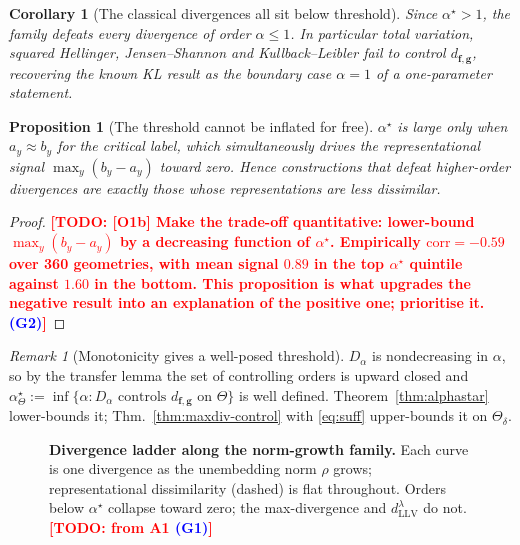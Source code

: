 \documentclass{article}
\newcommand{\TODO}[1]{\textcolor{red}{\textbf{[TODO: #1]}}}
\newcommand{\GATE}[1]{\textcolor{blue}{\textsf{\small (#1)}}}
\newcommand{\bff}{\mathbf{f}}
\newcommand{\bfg}{\mathbf{g}}
\newcommand{\dLLV}{d^{\lambda}_{\mathrm{LLV}}}
\newcommand{\dfg}{d_{\bff,\bfg}}
\newcommand{\Dalpha}{D_{\alpha}}
\newcommand{\Thetadelta}{\Theta_{\delta}}
\theoremstyle{plain}
\newtheorem{proposition}[theorem]{Proposition}
\newtheorem{corollary}[theorem]{Corollary}
\theoremstyle{definition}
\theoremstyle{remark}
\newtheorem{remark}[theorem]{Remark}
\begin{document}
\begin{corollary}[The classical divergences all sit below threshold]
\label{cor:below}
Since $\alpha^{\star}>1$, the family defeats every divergence of order
$\alpha\le1$. In particular total variation, squared Hellinger,
Jensen--Shannon and Kullback--Leibler fail to control $\dfg$, recovering the
known KL result as the boundary case $\alpha=1$ of a one-parameter statement.
\end{corollary}

\begin{proposition}[The threshold cannot be inflated for free]
\label{prop:tradeoff}
$\alpha^{\star}$ is large only when $a_{y}\approx b_{y}$ for the critical
label, which simultaneously drives the representational signal
$\max_{y}(b_{y}-a_{y})$ toward zero. Hence constructions that defeat
higher-order divergences are exactly those whose representations are less
dissimilar.
\end{proposition}
\begin{proof}
\TODO{[O1b] Make the trade-off quantitative: lower-bound
$\max_{y}(b_{y}-a_{y})$ by a decreasing function of $\alpha^{\star}$.
Empirically $\mathrm{corr}=-0.59$ over 360 geometries, with mean signal
$0.89$ in the top $\alpha^{\star}$ quintile against $1.60$ in the bottom.
This proposition is what upgrades the negative result into an explanation of
the positive one; prioritise it. \GATE{G2}}
\end{proof}

\begin{remark}[Monotonicity gives a well-posed threshold]
\label{rem:monotone}
$\Dalpha$ is nondecreasing in $\alpha$, so by the transfer lemma the set of
controlling orders is upward closed and
$\alpha^{\star}_{\Theta}:=\inf\{\alpha:\Dalpha\text{ controls }\dfg\text{ on }\Theta\}$
is well defined. Theorem~\ref{thm:alphastar} lower-bounds it;
Thm.~\ref{thm:maxdiv-control} with \eqref{eq:suff} upper-bounds it on
$\Thetadelta$.
\end{remark}

\begin{figure}[t]
\centering
\caption{\textbf{Divergence ladder along the norm-growth family.} Each curve is
one divergence as the unembedding norm $\rho$ grows; representational
dissimilarity (dashed) is flat throughout. Orders below $\alpha^{\star}$
collapse toward zero; the max-divergence and $\dLLV$ do not.
\TODO{from A1 \GATE{G1}}}
\label{fig:ladder}
\end{figure}
\end{document}
